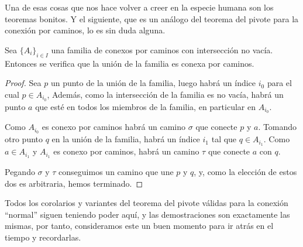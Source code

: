 Una de esas cosas que nos hace volver a creer en la especie humana son los teoremas bonitos. Y el siguiente, que es un análogo del teorema del pivote para la conexión por caminos, lo es sin duda alguna.
\begin{theo}
	Sea $\{A_i\}_{i\in I}$ una familia de conexos por caminos con intersección no vacía. Entonces se verifica que la unión de la familia es conexa por caminos.
\end{theo}
\begin{proof}
	Sea $p$ un punto de la unión de la familia, luego habrá un índice $i_0$ para el cual $p\in A_{i_0}$, Además, como la intersección de la familia es no vacía, habrá un punto $a$ que esté en todos los miembros de la familia, en particular en $A_{i_0}$.
	
	Como $A_{i_0}$ es conexo por caminos habrá un camino $\sigma$ que conecte $p$ y $a$. Tomando otro punto $q$ en la unión de la familia, habrá un índice $i_1$ tal que $q\in A_{i_1}$. Como $a\in A_{i_1}$ y $A_{i_1}$ es conexo por caminos, habrá un camino $\tau$ que conecte $a$ con $q$.
	
	Pegando $\sigma$ y $\tau$ conseguimos un camino que une $p$ y $q$, y, como la elección de estos dos es arbitraria, hemos terminado.
\end{proof}
Todos los corolarios y variantes del teorema del pivote válidas para la conexión ``normal'' siguen teniendo poder aquí, y las demostraciones son exactamente las mismas, por tanto, consideramos este un buen momento para ir atrás en el tiempo y recordarlas. 
